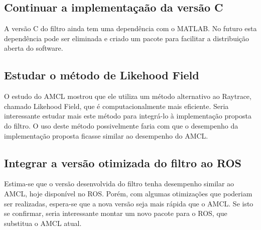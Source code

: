 \documentclass[
	12pt,				%
	openright,			%
	oneside,			%
	a4paper,			%
	english,			%
	french,				%
	spanish,			%
	brazil,				%
	]{abntex2}
\begin{document}
\subsection{Continuar a implementaçaão da versão C}

A versão C do filtro ainda tem uma dependência com o MATLAB. No futuro esta dependência pode ser eliminada e criado um pacote para facilitar a distribuição aberta do software.

\subsection{Estudar o método de Likehood Field}

O estudo do AMCL mostrou que ele utiliza um método alternativo ao Raytrace, chamado Likehood Field, que é computacionalmente mais eficiente. Seria interessante estudar mais este método para integrá-lo à implementação proposta do filtro. O uso deste método possivelmente faria com que o desempenho da implementação proposta ficasse similar ao desempenho do AMCL.

\subsection{Integrar a versão otimizada do filtro ao ROS}

Estima-se que o versão desenvolvida do filtro tenha desempenho similar ao AMCL, hoje disponível no ROS. Porém, com algumas otimizações que poderiam ser realizadas, espera-se que a nova versão seja mais rápida que o AMCL. Se isto se confirmar, seria interessante montar um novo pacote para o ROS, que substitua o AMCL atual. 

% 

\postextual




\end{document}
